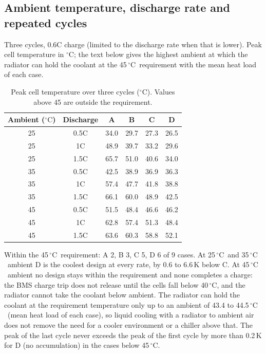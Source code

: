\documentclass[11pt,a4paper]{article}
\newcommand{\degC}{\ensuremath{{}^{\circ}\mathrm{C}}}
\begin{document}
\subsection{Ambient temperature, discharge rate and repeated cycles}
Three cycles, 0.6C charge (limited to the discharge rate when that is lower). Peak cell temperature in \degC; the text below gives the highest ambient at which the radiator can hold the coolant at the 45\,\degC\ requirement with the mean heat load of each case.
\begin{table}[H]
\centering\scriptsize
\begin{tabular}{@{}cc cccc@{}}
\toprule
Ambient (\degC) & Discharge & A & B & C & D \\
\midrule
25 & 0.5C & 34.0 & 29.7 & 27.3 & 26.5 \\
25 & 1C & 48.9 & 39.7 & 33.2 & 29.6 \\
25 & 1.5C & 65.7 & 51.0 & 40.6 & 34.0 \\
35 & 0.5C & 42.5 & 38.9 & 36.9 & 36.3 \\
35 & 1C & 57.4 & 47.7 & 41.8 & 38.8 \\
35 & 1.5C & 66.1 & 60.0 & 48.9 & 42.5 \\
45 & 0.5C & 51.5 & 48.4 & 46.6 & 46.2 \\
45 & 1C & 62.8 & 57.4 & 51.3 & 48.4 \\
45 & 1.5C & 63.6 & 60.3 & 58.8 & 52.1 \\
\bottomrule
\end{tabular}
\caption{Peak cell temperature over three cycles (\degC). Values above 45 are outside the requirement.}\label{tab:study}
\end{table}
Within the 45\,\degC\ requirement: A 2, B 3, C 5, D 6 of 9 cases. At 25\,\degC\ and 35\,\degC\ ambient D is the coolest design at every rate, by 0.6 to 6.6\,K below C. At 45\,\degC\ ambient no design stays within the requirement and none completes a charge: the BMS charge trip does not release until the cells fall below 40\,\degC, and the radiator cannot take the coolant below ambient. The radiator can hold the coolant at the requirement temperature only up to an ambient of 43.4 to 44.5\,\degC\ (mean heat load of each case), so liquid cooling with a radiator to ambient air does not remove the need for a cooler environment or a chiller above that. The peak of the last cycle never exceeds the peak of the first cycle by more than 0.2\,K for D (no accumulation) in the cases below 45\,\degC.
\end{document}
